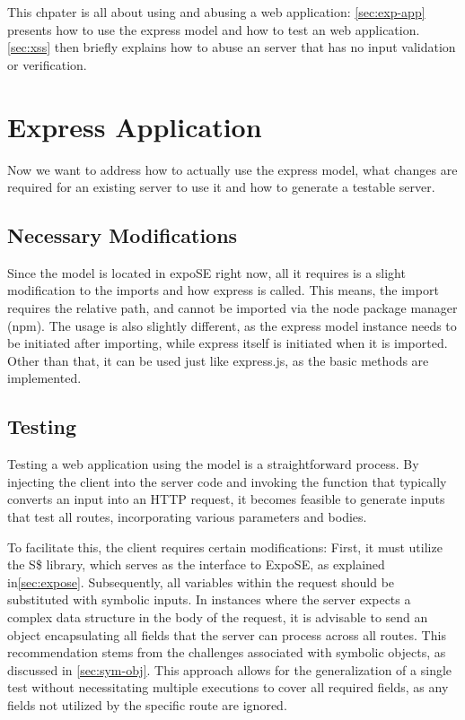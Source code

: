 
This chpater is all about using and abusing a web application:
\autoref{sec:exp-app} presents how to use the express model and how to test an web application. 
\autoref{sec:xss} then briefly explains how to abuse an server that has no input validation or verification.


\section{Express Application}
\label{sec:exp-app}
Now we want to address how to actually use the express model, 
what changes are required for an existing server to use it and how to generate a testable server.


\subsection{Necessary Modifications} 
\label{sec:nec-mods}

Since the model is located in expoSE right now, all it requires is a slight modification to the imports and how express is called.
This means, the import requires the relative path, and cannot be imported via the node package manager (npm). 
The usage is also slightly different, as the express model instance needs to be initiated after importing,
while express itself is initiated when it is imported. 
Other than that, it can be used just like express.js, as the basic methods are implemented.



\subsection{Testing} 
\label{sec:app-testing}

Testing a web application using the model is a straightforward process.
By injecting the client into the server code and invoking the function that typically converts an input into an HTTP request,
it becomes feasible to generate inputs that test all routes, incorporating various parameters and bodies.

To facilitate this, the client requires certain modifications: 
First, it must utilize the S\$ library, which serves as the interface to ExpoSE, as explained in\autoref{sec:expose}. 
Subsequently, all variables within the request should be substituted with symbolic inputs. 
In instances where the server expects a complex data structure in the body of the request,
it is advisable to send an object encapsulating all fields that the server can process across all routes.
This recommendation stems from the challenges associated with symbolic objects, as discussed in \autoref{sec:sym-obj}. 
This approach allows for the generalization of a single test without necessitating multiple executions to cover all required fields,
as any fields not utilized by the specific route are ignored.


